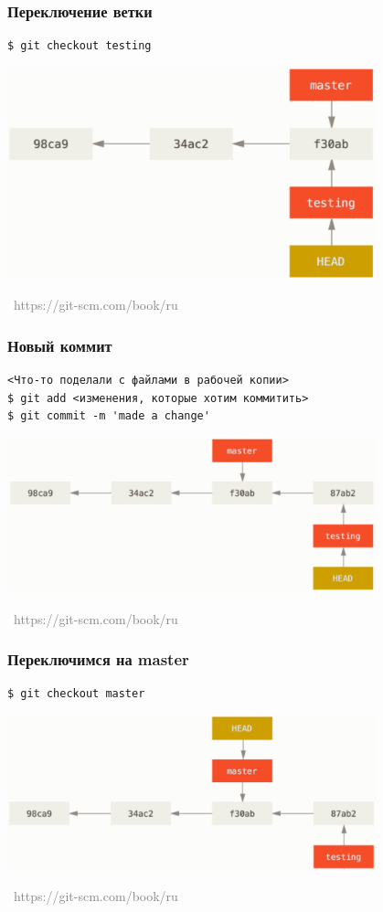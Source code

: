 \documentclass[xetex,mathserif,serif]{beamer}
\newcommand{\attribution}[1] {
\vspace{-5mm}\begin{flushright}\begin{scriptsize}\textcolor{gray}{\textcopyright\, #1}\end{scriptsize}\end{flushright}
}
\begin{document}
	\begin{frame}[fragile]
		\frametitle{Переключение ветки}
		\begin{verbatim}
$ git checkout testing
		\end{verbatim}
		\begin{center}
			\includegraphics[width=0.8\textwidth]{checkout.png}
			\attribution{https://git-scm.com/book/ru}
		\end{center}
	\end{frame}

	\begin{frame}[fragile]
		\frametitle{Новый коммит}
		\begin{verbatim}
<Что-то поделали с файлами в рабочей копии>
$ git add <изменения, которые хотим коммитить>
$ git commit -m 'made a change'
		\end{verbatim}
		\begin{center}
			\includegraphics[width=0.8\textwidth]{newCommit.png}
			\attribution{https://git-scm.com/book/ru}
		\end{center}
	\end{frame}

	\begin{frame}[fragile]
		\frametitle{Переключимся на master}
		\begin{verbatim}
$ git checkout master
		\end{verbatim}
		\begin{center}
			\includegraphics[width=0.8\textwidth]{checkoutToMaster.png}
			\attribution{https://git-scm.com/book/ru}
		\end{center}
	\end{frame}
\end{document}
